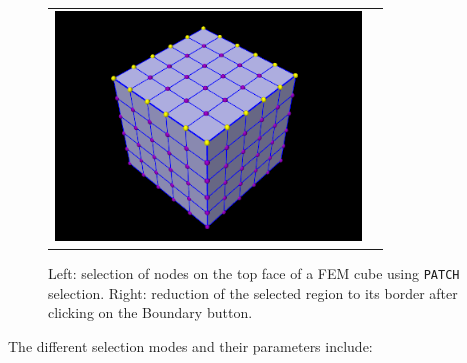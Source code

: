 \documentclass{article}
\begin{document}
\begin{figure}[h]
\begin{center}
\begin{tabular}{cc}
\includegraphics[width=3.2in]{images/nodePatchBorderSelect}
\fi
\end{tabular}
\end{center}
\caption{Left: selection of nodes on the top face of a FEM cube using
{\tt PATCH} selection. Right: reduction of the selected region
to its border after clicking on the {\sf Boundary} button.}%
\label{nodePatchSelect:fig}
\end{figure}

The different selection modes and their parameters include:
\end{document}
